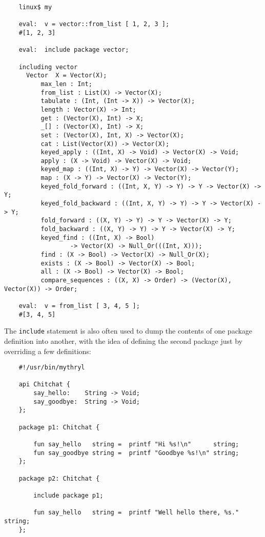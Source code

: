 \begin{verbatim}
    linux$ my

    eval:  v = vector::from_list [ 1, 2, 3 ];
    #[1, 2, 3]

    eval:  include package vector;

    including vector
      Vector  X = Vector(X);
          max_len : Int;
          from_list : List(X) -> Vector(X);
          tabulate : (Int, (Int -> X)) -> Vector(X);
          length : Vector(X) -> Int;
          get : (Vector(X), Int) -> X;
          _[] : (Vector(X), Int) -> X;
          set : (Vector(X), Int, X) -> Vector(X);
          cat : List(Vector(X)) -> Vector(X);
          keyed_apply : ((Int, X) -> Void) -> Vector(X) -> Void;
          apply : (X -> Void) -> Vector(X) -> Void;
          keyed_map : ((Int, X) -> Y) -> Vector(X) -> Vector(Y);
          map : (X -> Y) -> Vector(X) -> Vector(Y);
          keyed_fold_forward : ((Int, X, Y) -> Y) -> Y -> Vector(X) -> Y;
          keyed_fold_backward : ((Int, X, Y) -> Y) -> Y -> Vector(X) -> Y;
          fold_forward : ((X, Y) -> Y) -> Y -> Vector(X) -> Y;
          fold_backward : ((X, Y) -> Y) -> Y -> Vector(X) -> Y;
          keyed_find : ((Int, X) -> Bool)
                  -> Vector(X) -> Null_Or(((Int, X)));
          find : (X -> Bool) -> Vector(X) -> Null_Or(X);
          exists : (X -> Bool) -> Vector(X) -> Bool;
          all : (X -> Bool) -> Vector(X) -> Bool;
          compare_sequences : ((X, X) -> Order) -> (Vector(X), Vector(X)) -> Order;

    eval:  v = from_list [ 3, 4, 5 ];
    #[3, 4, 5]
\end{verbatim}

The {\tt include} statement is also often used to dump the contents of 
one package definition into another, with the idea of defining the second 
package just by overriding a few definitions:

\begin{verbatim}
    #!/usr/bin/mythryl

    api Chitchat {
        say_hello:    String -> Void;
        say_goodbye:  String -> Void;
    };

    package p1: Chitchat {

        fun say_hello   string =  printf "Hi %s!\n"      string;
        fun say_goodbye string =  printf "Goodbye %s!\n" string;
    };

    package p2: Chitchat {

        include package p1;

        fun say_hello   string =  printf "Well hello there, %s."  string;
    };
\end{verbatim}

